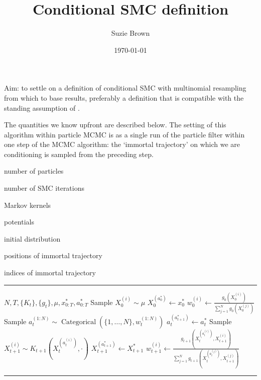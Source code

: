 \documentclass[fleqn]{article}
\title{Conditional SMC definition}
\author{Suzie Brown}
\date{\today}
\newcommand{\Cat}{\operatorname{Categorical}}
\begin{document}
\maketitle

Aim: to settle on a definition of conditional SMC with multinomial resampling from which to base results, preferably a definition that is compatible with the standing assumption of \citet{koskela2018}.

The quantities we know upfront are described below. The setting of this algorithm within particle MCMC \citep{andrieu2010} is as a single run of the particle filter within one step of the MCMC algorithm: the `immortal trajectory' on which we are conditioning is sampled from the preceding step.

\begin{description}[style=multiline,leftmargin=2.5cm]
\item [$N$] number of particles
\item [$T$] number of SMC iterations
\item [$\{K_t\}_{t=1,\dots,T}$] Markov kernels
\item [$\{g_t\}_{t=0,\dots,T}$] potentials
\item [$\mu$] initial distribution
\item [$x_{0:T}^*$] positions of immortal trajectory
\item [$a_{0:T}^*$] indices of immortal trajectory
\end{description}

\hrule
\begin{algorithmic}[1]
\Require $N, T, \{K_t\}, \{g_t\}, \mu, x_{0:T}^*, a_{0:T}^*$
	\State Sample $X_0^{(i)} \sim \mu$ 
\EndFor
\State $X_0^{(a_0^*)} \gets x_0^*$
	\State $w_0^{(i)} \gets \frac{g_0(X_0^{(i)})}{\sum_{j=1}^N g_0(X_0^{(j)})}$
\EndFor
{}
	\State Sample $a_t^{(1:N)} \sim \Cat(\{1,\dots,N\}, w_t^{(1:N)})$
	\State $a_t^{(a_{t+1}^*)} \gets a_t^*$
		\State Sample $X_{t+1}^{(i)} \sim K_{t+1}(X_t^{(a_t^{(i)})}, \cdot)$
	\EndFor
	\State $X_{t+1}^{(a_{t+1}^*)} \gets X_{t+1}^*$
		\State $w_{t+1}^{(i)} \gets \frac{g_{t+1}(X_t^{(a_t^{(i)})} , X_{t+1}^{(i)})}{\sum_{j=1}^N g_{t+1}(X_t^{(a_t^{(j)})} , X_{t+1}^{(j)})}$
	\EndFor
\EndFor
\end{algorithmic}
\hrule
\end{document}
